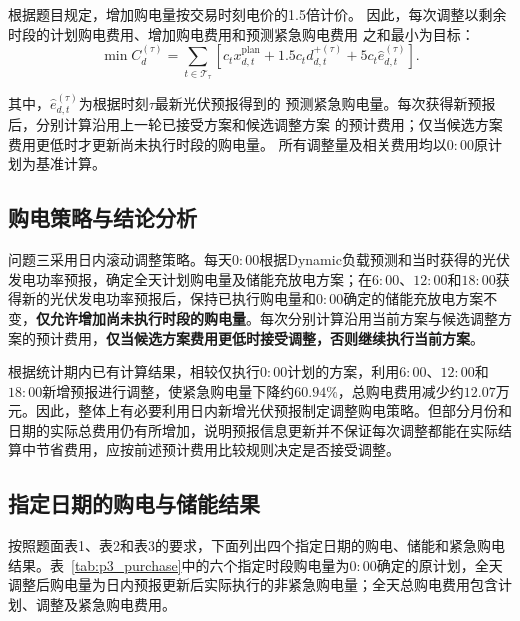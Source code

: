 根据题目规定，增加购电量按交易时刻电价的1.5倍计价。
因此，每次调整以剩余时段的计划购电费用、增加购电费用和预测紧急购电费用
之和最小为目标：
\begin{equation}
\min C_d^{(\tau)}
=
\sum_{t\in\mathcal{T}_{\tau}}
\left[
c_t x_{d,t}^{\mathrm{plan}}
+
1.5c_t d_{d,t}^{+(\tau)}
+
5c_t\widehat e_{d,t}^{(\tau)}
\right].
\label{eq:p3_adjust_obj}
\end{equation}

其中，$\widehat e_{d,t}^{(\tau)}$为根据时刻$\tau$最新光伏预报得到的
预测紧急购电量。每次获得新预报后，分别计算沿用上一轮已接受方案和候选调整方案
的预计费用；仅当候选方案费用更低时才更新尚未执行时段的购电量。
所有调整量及相关费用均以$0{:}00$原计划为基准计算。


\subsection{购电策略与结论分析}



问题三采用日内滚动调整策略。每天$0{:}00$根据Dynamic负载预测和当时获得的光伏发电功率预报，确定全天计划购电量及储能充放电方案；在$6{:}00$、$12{:}00$和$18{:}00$获得新的光伏发电功率预报后，保持已执行购电量和$0{:}00$确定的储能充放电方案不变，\textbf{仅允许增加尚未执行时段的购电量}。每次分别计算沿用当前方案与候选调整方案的预计费用，\textbf{仅当候选方案费用更低时接受调整，否则继续执行当前方案}。




根据统计期内已有计算结果，相较仅执行$0{:}00$计划的方案，利用$6{:}00$、$12{:}00$和$18{:}00$新增预报进行调整，使紧急购电量下降约$60.94\%$，总购电费用减少约$12.07$万元。因此，整体上有必要利用日内新增光伏预报制定调整购电策略。但部分月份和日期的实际总费用仍有所增加，说明预报信息更新并不保证每次调整都能在实际结算中节省费用，应按前述预计费用比较规则决定是否接受调整。

\subsection{指定日期的购电与储能结果}

按照题面表1、表2和表3的要求，下面列出四个指定日期的购电、储能和紧急购电结果。表~\ref{tab:p3_purchase}中的六个指定时段购电量为$0{:}00$确定的原计划，全天调整后购电量为日内预报更新后实际执行的非紧急购电量；全天总购电费用包含计划、调整及紧急购电费用。


